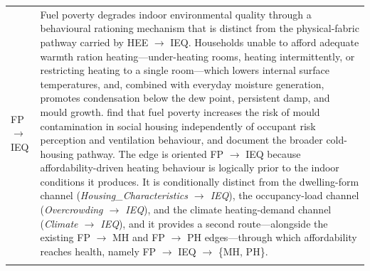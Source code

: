 \begin{longtable}{@{}p{3.8cm}p{11.2cm}@{}}
FP $\rightarrow$ IEQ &
Fuel poverty degrades indoor environmental quality through a behavioural rationing mechanism that is distinct from the physical-fabric pathway carried by HEE $\rightarrow$ IEQ. Households unable to afford adequate warmth ration heating---under-heating rooms, heating intermittently, or restricting heating to a single room---which lowers internal surface temperatures, and, combined with everyday moisture generation, promotes condensation below the dew point, persistent damp, and mould growth. \citet{sharpe_fuel_2015} find that fuel poverty increases the risk of mould contamination in social housing independently of occupant risk perception and ventilation behaviour, and \citet{liddell_living_2015} document the broader cold-housing pathway. The edge is oriented FP $\rightarrow$ IEQ because affordability-driven heating behaviour is logically prior to the indoor conditions it produces. It is conditionally distinct from the dwelling-form channel (\textit{Housing\_Characteristics $\rightarrow$ IEQ}), the occupancy-load channel (\textit{Overcrowding $\rightarrow$ IEQ}), and the climate heating-demand channel (\textit{Climate $\rightarrow$ IEQ}), and it provides a second route---alongside the existing FP $\rightarrow$ MH and FP $\rightarrow$ PH edges---through which affordability reaches health, namely FP $\rightarrow$ IEQ $\rightarrow$ \{MH, PH\}. \\
\addlinespace

\end{longtable}


